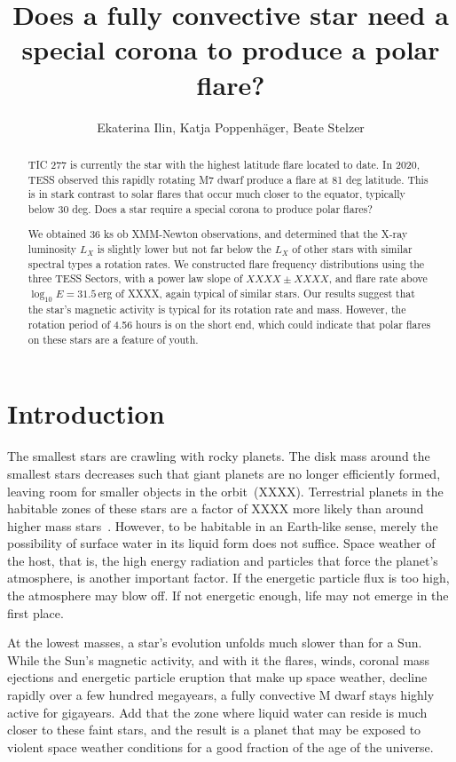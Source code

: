 \documentclass[twocolumn]{aastex631}
\begin{document}
\title{Does a fully convective star need a special corona to produce a polar flare?}

\author{Ekaterina Ilin, Katja Poppenh\"ager, Beate Stelzer}


\begin{abstract}
    TIC 277 is currently the star with the highest latitude flare located to date. In 2020, TESS observed this rapidly rotating M7 dwarf produce a flare at 81 deg latitude. This is in stark contrast to solar flares that occur much closer to the equator, typically below 30 deg. Does a star require a special corona to produce polar flares?

    We obtained 36 ks ob XMM-Newton observations, and determined that the X-ray luminosity $L_X$ is slightly lower but not far below the $L_X$ of other stars with similar spectral types a rotation rates. We constructed flare frequency distributions using the three TESS Sectors, with a power law slope of $XXXX\pm XXXX$, and flare rate above $\log_{10}E=31.5\,$erg of XXXX, again typical of similar stars. Our results suggest that the star's magnetic activity is typical for its rotation rate and mass. However, the rotation period of 4.56 hours is on the short end, which could indicate that polar flares on these stars are a feature of youth.  
    
\end{abstract}

\section{Introduction}
\label{sec:intro}
The smallest stars are crawling with rocky planets. The disk mass around the smallest stars decreases such that giant planets are no longer efficiently formed, leaving room for smaller objects in the orbit~(XXXX). Terrestrial planets in the habitable zones of these stars are a factor of XXXX more likely than around higher mass stars~\citep{hardegree-ullman2019kepler}. However, to be habitable in an Earth-like sense, merely the possibility of surface water in its liquid form does not suffice. Space weather of the host, that is, the high energy radiation and particles that force the planet's atmosphere, is another important factor. If the energetic particle flux is too high, the atmosphere may blow off. If not energetic enough, life may not emerge in the first place.

At the lowest masses, a star's evolution unfolds much slower than for a Sun. While the Sun's magnetic activity, and with it the flares, winds, coronal mass ejections and energetic particle eruption that make up space weather, decline rapidly over a few hundred megayears, a fully convective M dwarf stays highly active for gigayears. Add that the zone where liquid water can reside is much closer to these faint stars, and the result is a planet that may be exposed to violent space weather conditions for a good fraction of the age of the universe. 
\end{document}
